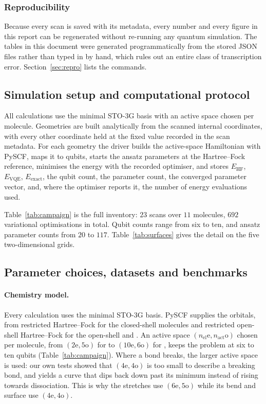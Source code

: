 \documentclass[sigconf,screen,nonacm]{acmart}
\begin{document}
\subsubsection{Reproducibility}

Because every scan is saved with its metadata, every number and every figure
in this report can be regenerated without re-running any quantum simulation.
The tables in this document were generated programmatically from the stored
JSON files rather than typed in by hand, which rules out an entire class of
transcription error. Section~\ref{sec:repro} lists the commands.

\subsection{Simulation setup and computational protocol}
\label{sec:protocol}
All calculations use the minimal STO-3G basis with an active space chosen
per molecule. Geometries are built analytically from the scanned internal
coordinates, with every other coordinate held at the fixed value recorded in
the scan metadata. For each geometry the driver builds the active-space
Hamiltonian with PySCF, maps it to qubits, starts the ansatz parameters at
the Hartree--Fock reference, minimises the energy with the recorded
optimiser, and stores $E_{\text{HF}}$, $E_{\text{VQE}}$, $E_{\text{exact}}$,
the qubit count, the parameter count, the converged parameter vector, and,
where the optimiser reports it, the number of energy evaluations used.

Table~\ref{tab:campaign} is the full inventory: $23$ scans over $11$
molecules, $692$ variational optimisations in total. Qubit counts range from
six to ten, and ansatz parameter counts from $20$ to $117$.
Table~\ref{tab:surfaces} gives the detail on the five two-dimensional grids.




\subsection{Parameter choices, datasets and benchmarks}
\label{sec:params}

\paragraph{Chemistry model.}
Every calculation uses the minimal STO-3G basis. PySCF supplies the orbitals,
from restricted Hartree--Fock for the closed-shell molecules and restricted
open-shell Hartree--Fock for the open-shell  and . An active
space $(n_{\text{el}}\text{e},n_{\text{act}}\text{o})$ chosen per molecule,
from $(2\text{e},5\text{o})$ for  to $(10\text{e},6\text{o})$ for
, keeps the problem at six to ten qubits (Table~\ref{tab:campaign}).
Where a bond breaks, the larger active space is used: our own tests showed
that $(4\text{e},4\text{o})$ is too small to describe a breaking bond, and
yields a curve that dips back down past its minimum instead of rising towards
dissociation. This is why the  stretches use $(6\text{e},5\text{o})$
while its bend and surface use $(4\text{e},4\text{o})$.
\end{document}
